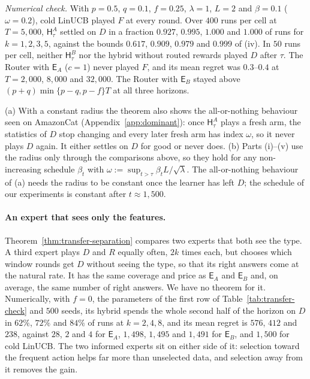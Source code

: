 \documentclass[anon]{alt2027} %
\newcommand{\Exp}{\mathsf{E}}
\newcommand{\Hyb}{\mathsf{H}}
\begin{document}
\emph{Numerical check.} With $p=0.5$, $q=0.1$, $f=0.25$, $\lambda=1$, $L=2$
and $\beta=0.1$ ($\omega=0.2$), cold LinUCB played $F$ at every round. Over
$400$ runs per cell at $T=5{,}000$, $\Hyb^A_\tau$ settled on $D$ in a
fraction $0.927$, $0.995$, $1.000$ and $1.000$ of runs for $k=1,2,3,5$,
against the bounds $0.617$, $0.909$, $0.979$ and $0.999$ of (iv). In $50$
runs per cell, neither $\Hyb^B_\tau$ nor the hybrid without routed rewards
played $D$ after $\tau$. The Router with $\Exp_A$ ($c=1$) never played $F$,
and its mean regret was $0.3$--$0.4$ at $T=2{,}000$, $8{,}000$ and
$32{,}000$. The Router with $\Exp_B$ stayed above $(p+q)\min\{p-q,p-f\}T$
at all three horizons.

\begin{remark}
\label{rem:transfer-extensions}
(a) With a constant radius the theorem also shows the all-or-nothing
behaviour seen on AmazonCat (Appendix~\ref{app:dominant}): once
$\Hyb^A_\tau$ plays a fresh arm, the statistics of $D$ stop changing and every
later fresh arm has index $\omega$, so it never plays $D$ again. It either
settles on $D$ for good or never does.
(b) Parts (i)--(v) use the radius only through the comparisons above, so they
hold for any non-increasing schedule $\beta_t$ with
$\omega:=\sup_{t>\tau}\beta_tL/\sqrt\lambda$. The all-or-nothing behaviour of
(a) needs the radius to be constant once the learner has left $D$; the
schedule of our experiments is constant after $t\approx1{,}500$.
\end{remark}

\paragraph{An expert that sees only the features.}
Theorem~\ref{thm:transfer-separation} compares two experts that both see the
type. A third expert plays $D$ and $R$ equally often, $2k$ times each, but
chooses which window rounds get $D$ without seeing the type, so that its right
answers come at the natural rate. It has the same coverage and price as
$\Exp_A$ and $\Exp_B$ and, on average, the same number of right answers. We
have no theorem for it. Numerically, with $f=0$, the parameters of the first row of
Table~\ref{tab:transfer-check} and $500$ seeds, its hybrid spends the whole
second half of the horizon on $D$ in $62\%$, $72\%$ and $84\%$ of runs at
$k=2,4,8$, and its mean regret is $576$, $412$ and $238$, against $28$, $2$
and $4$ for $\Exp_A$, $1{,}498$, $1{,}495$ and $1{,}491$ for $\Exp_B$, and
$1{,}500$ for cold LinUCB. The two informed experts sit on either side of it:
selection toward the frequent action helps far more than unselected data, and
selection away from it removes the gain.
\end{document}
